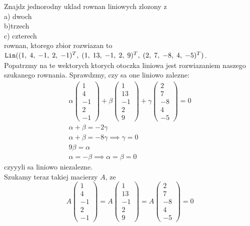 \documentclass{article}
\begin{document}
\ttfamily
{\large\color{acc}Znajdz jednorodny uklad rownan liniowych zlozony z\\
a) dwoch\\
b)trzech\\
c) czterech\\
rownan, ktorego zbior rozwiazan to $\texttt{Lin}((1,\;4,\;-1,\;2,\;-1)^T,\;(1,\;13,\;-1,\;2,\;9)^T,\;(2,\;7,\;-8,\;4,\;-5)^T)$.}\bigskip\\
Popatrzmy na te wektorych ktorych otoczka liniowa jest rozwiazaniem naszego szukanego rownania. Sprawdzmy, czy sa one liniowo zalezne:
\begin{align*}\alpha
    \begin{pmatrix}
        1\\4\\-1\\2\\-1
    \end{pmatrix}
    +\beta\begin{pmatrix}
        1\\13\\-1\\2\\9
    \end{pmatrix}
    +\gamma\begin{pmatrix}
        2\\7\\-8\\4\\-5
    \end{pmatrix}=0\\
    \alpha+\beta=-2\gamma\\
    \alpha+\beta=-8\gamma \implies \gamma = 0\\
    9\beta=\alpha\\
    \alpha=-\beta\implies \alpha=\beta=0
\end{align*}
czyyyli sa liniowo niezalezne.\medskip\\
Szukamy teraz takiej macierzy $A$, ze
$$A\begin{pmatrix}
    1\\4\\-1\\2\\-1
\end{pmatrix}=A\begin{pmatrix}
    1\\13\\-1\\2\\9
\end{pmatrix}=A\begin{pmatrix}
    2\\7\\-8\\4\\-5
\end{pmatrix}=0$$
\end{document}
